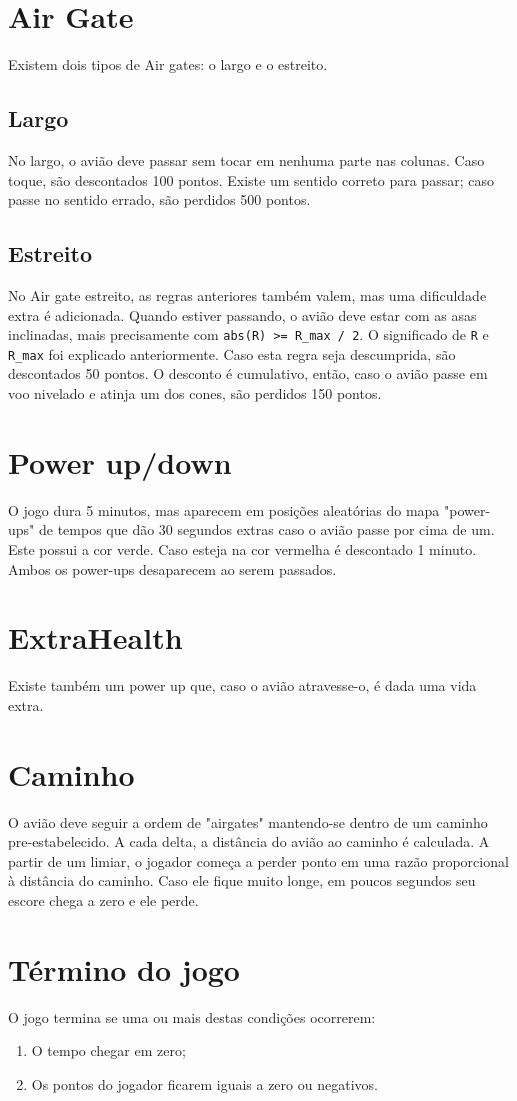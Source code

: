 \section*{Air Gate}
Existem dois tipos de Air gates: o largo e o estreito.

\subsection*{Largo}
No largo, o avião deve passar sem tocar em nenhuma parte nas colunas. Caso toque, são descontados 100 pontos. Existe um sentido correto para passar; caso passe no sentido errado, são perdidos 500 pontos.

\subsection*{Estreito}
No Air gate estreito, as regras anteriores também valem, mas uma dificuldade extra é adicionada. Quando estiver passando, o avião deve estar com as asas inclinadas, mais precisamente com \texttt{abs(R) >= R\_max / 2}. O significado de \texttt{R} e \texttt{R\_max} foi explicado anteriormente. 
Caso esta regra seja descumprida, são descontados 50 pontos. O desconto é cumulativo, então, caso o avião passe em voo nivelado e atinja um dos cones, são perdidos 150 pontos.

\section*{Power up/down}
O jogo dura 5 minutos, mas aparecem em posições aleatórias do mapa "power-ups" de tempos que dão 30 segundos extras caso o avião passe por cima de um. 
Este possui a cor verde. Caso esteja na cor vermelha é descontado 1 minuto. Ambos os power-ups desaparecem ao serem passados.

\section*{ExtraHealth}
Existe também um power up que, caso o avião atravesse-o, é dada uma vida extra.

\section*{Caminho}
O avião deve seguir a ordem de "airgates" mantendo-se dentro de um caminho pre-estabelecido. A cada delta, a distância do avião ao caminho é calculada. A partir de um limiar, o jogador começa a perder ponto em uma razão proporcional à distância do caminho. Caso ele fique muito longe, em poucos segundos seu escore chega a zero e ele perde.

\section*{Término do jogo}
O jogo termina se uma ou mais destas condições ocorrerem:
\begin{enumerate}
    \item O tempo chegar em zero;
    \item Os pontos do jogador ficarem iguais a zero ou negativos.
\end{enumerate}
